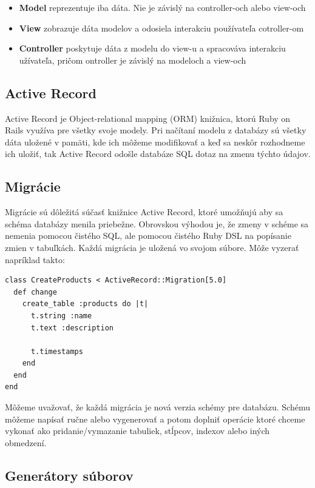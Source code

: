 \begin{itemize}
    \item \textbf{Model} reprezentuje iba dáta. Nie je závislý na controller-och alebo view-och
    \item \textbf{View} zobrazuje dáta modelov a odosiela interakciu používateľa cotroller-om
    \item \textbf{Controller} poskytuje dáta z modelu do view-u a spracováva interakciu užívateľa, pričom ontroller je závislý na modeloch a view-och
\end{itemize}

\subsection{Active Record}

Active Record je Object-relational mapping (ORM) knižnica, ktorú Ruby on Rails využíva pre všetky svoje modely. Pri načítaní modelu z databázy sú všetky dáta uložené v pamäti, kde ich môžeme modifikovať a keď sa neskôr rozhodneme ich uložiť, tak Active Record odošle databáze SQL dotaz na zmenu týchto údajov.

\subsection{Migrácie}

Migrácie sú dôležitá súčasť knižnice Active Record, ktoré umožňujú aby sa schéma databázy menila priebežne. Obrovskou výhodou je, že zmeny v schéme sa nemenia pomocou čistého SQL, ale pomocou čistého Ruby DSL na popísanie zmien v tabuľkách.
Každá migrácia je uložená vo svojom súbore. Môže vyzerať napríklad takto:

\begin{verbatim}
class CreateProducts < ActiveRecord::Migration[5.0]
  def change
    create_table :products do |t|
      t.string :name
      t.text :description
 
      t.timestamps
    end
  end
end
\end{verbatim}

Môžeme uvažovať, že každá migrácia je nová verzia schémy pre databázu. Schému môžeme napísať ručne alebo vygenerovať a potom doplniť operácie ktoré chceme vykonať ako pridanie/vymazanie tabuliek, stĺpcov, indexov alebo iných obmedzení.

\subsection*{Generátory súborov}

